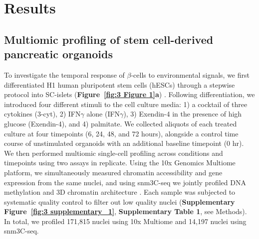 \section{Results}

\subsection{Multiomic profiling of stem cell-derived pancreatic organoids}

To investigate the temporal response of $\beta$-cells to environmental signals, we first differentiated H1 human pluripotent stem cells (hESCs) through a stepwise protocol into SC-islets (\textbf{Figure~\ref{fig:3 Figure 1}\textbf{a}}) \cite{Hogrebe2020-rr,Rezania2014-nz,Veres2019-qb,Velazco-Cruz2019-yq,Zhu2023-qm}. Following differentiation, we introduced four different stimuli to the cell culture media: 1) a cocktail of three cytokines (3-cyt), 2) IFN$\gamma$ alone (IFN$\gamma$), 3) Exendin-4 in the presence of high glucose (Exendin-4), and 4) palmitate. We collected aliquots of each treated culture at four timepoints (6, 24, 48, and 72 hours), alongside a control time course of unstimulated organoids with an additional baseline timepoint (0 hr). We then performed multiomic single-cell profiling across conditions and timepoints using two assays in replicate. Using the 10x Genomics Multiome platform, we simultaneously measured chromatin accessibility and gene expression from the same nuclei, and using snm3C-seq we jointly profiled DNA methylation and 3D chromatin architecture \cite{Liu2021-km}. Each sample was subjected to systematic quality control to filter out low quality nuclei (\textbf{Supplementary Figure~\ref{fig:3 supplementary_1}}, \textbf{Supplementary Table 1}, see Methods). In total, we profiled 171{,}815 nuclei using 10x Multiome and 14{,}197 nuclei using snm3C-seq.


